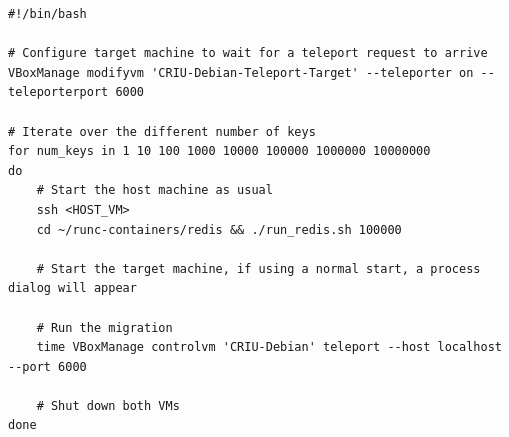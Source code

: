

\begin{lstlisting}[style=Bash,caption={Script to teleport a VirtualBox VM, and run the macrobenchmark.},label={code:vm-teleport}]
#!/bin/bash

# Configure target machine to wait for a teleport request to arrive
VBoxManage modifyvm 'CRIU-Debian-Teleport-Target' --teleporter on --teleporterport 6000

# Iterate over the different number of keys
for num_keys in 1 10 100 1000 10000 100000 1000000 10000000
do
    # Start the host machine as usual
    ssh <HOST_VM>
    cd ~/runc-containers/redis && ./run_redis.sh 100000

    # Start the target machine, if using a normal start, a process dialog will appear

    # Run the migration
    time VBoxManage controlvm 'CRIU-Debian' teleport --host localhost --port 6000

    # Shut down both VMs
done
\end{lstlisting}

